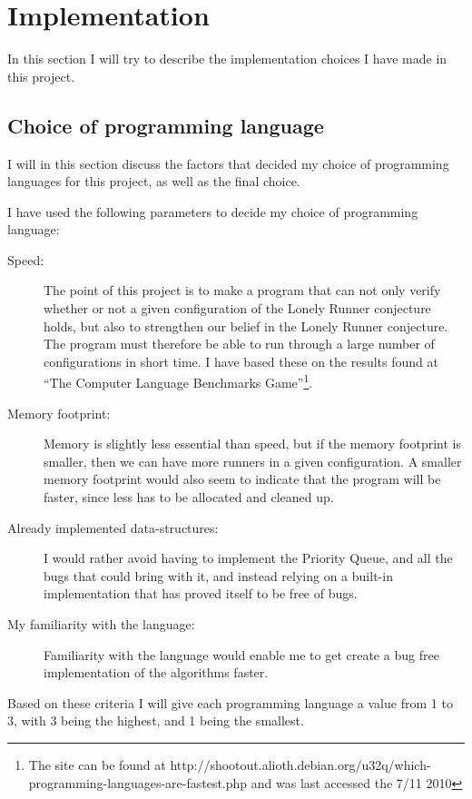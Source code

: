 \section{Implementation}
\label{implementation}

In this section I will try to describe the implementation choices I have made in this project.


\subsection{Choice of programming language}
I will in this section discuss the factors that decided my choice of programming languages for this project, as well as the final choice.

I have used the following parameters to decide my choice of programming language:
\begin{description}
\item[Speed:] The point of this project is to make a program that can not only verify whether or not a given configuration of the Lonely Runner conjecture holds, but also to strengthen our belief in the Lonely Runner conjecture. The program must therefore be able to run through a large number of configurations in short time. I have based these on the results found at ``The Computer Language Benchmarks Game''\footnote{The site can be found at http://shootout.alioth.debian.org/u32q/which-programming-languages-are-fastest.php and was last accessed the 7/11 2010}.
\item[Memory footprint:] Memory is slightly less essential than speed, but if the memory footprint is smaller, then we can have more runners in a given configuration. A smaller memory footprint would also seem to indicate that the program will be faster, since less has to be allocated and cleaned up. 
\item[Already implemented data-structures:] I would rather avoid having to implement the Priority Queue, and all the bugs that could bring with it, and instead relying on a built-in implementation that has proved itself to be free of bugs.
\item[My familiarity with the language:] Familiarity with the language would enable me to get create a bug free implementation of the algorithms faster.
\end{description}

Based on these criteria I will give each programming language a value from 1 to 3, with 3 being the highest, and 1 being the smallest. 

